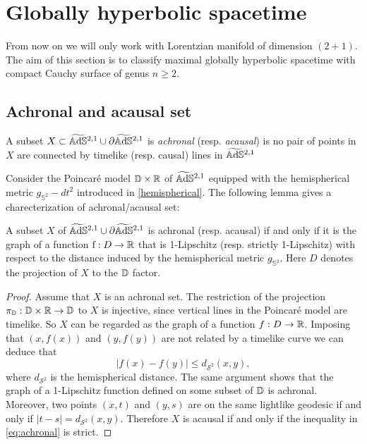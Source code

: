 \chapter{Globally hyperbolic spacetime}\label{chapter:4}

From now on we will only work with Lorentzian manifold of dimension $(2+1)$.\\
The aim of this section is to classify maximal globally hyperbolic spacetime with compact Cauchy surface of genus $n\geq 2$.

\section{Achronal and acausal set}

\begin{definition}
    A subset $X \subset \widetilde{\mathbb{A}\mathrm{d}\mathbb{S}}{}^{2,1} \cup \partial\widetilde{\mathbb{A}\mathrm{d}\mathbb{S}}{}^{2,1}$ is \textit{achronal} (resp. \textit{acausal}) is no pair of points in $X$ are connected by timelike (resp. causal) lines in $\widetilde{\mathbb{A}\mathrm{d}\mathbb{S}}{}^{2,1}$
\end{definition}
Consider the Poincaré model $\mathbb{D}\times\mathbb{R}$ of $\widetilde{\mathbb{A}\mathrm{d}\mathbb{S}}{}^{2,1}$ equipped with the hemispherical metric $g_{\mathbb{S}^2} - dt^2$ introduced in \ref{hemispherical}. The following lemma gives a charecterization of achronal/acausal set:
\begin{lemma}\label{lem:1-lip}
    A subset $X$ of $\widetilde{\mathbb{A}\mathrm{d}\mathbb{S}}{}^{2,1} \cup \partial\widetilde{\mathbb{A}\mathrm{d}\mathbb{S}}{}^{2,1}$ is achronal (resp. acausal) if and only if it is the graph of a function $\text{f} : D \to \mathbb{R}$ that is 1-Lipschitz (resp. strictly 1-Lipschitz) with respect to the distance induced by the hemispherical metric $g_{\mathbb{S}^2}$. Here $D$ denotes the projection of $X$ to the $\mathbb{D}$ factor.
\end{lemma} 
\begin{proof}
    Assume that $X$ is an achronal set. The restriction of the projection $\pi_{\mathbb{D}} : \mathbb{D} \times \mathbb{R} \to \mathbb{D}$ to $X$ is injective, since vertical lines in the Poincaré model are timelike. So $X$ can be regarded as the graph of a function $f : D \to\mathbb{R}$. Imposing that $(x,f(x))$ and $(y,f(y))$ are not related by a timelike curve we can deduce that
    \begin{equation} \label{eq:achronal}
        |f(x) - f(y)| \leq d_{\mathcal{S}^2}(x,y),
    \end{equation}
    where $d_{\mathcal{S}^2}$ is the hemispherical distance. The same argument shows that the graph of a 1-Lipschitz function defined on some subset of $\mathbb{D}$ is achronal.\\
    Moreover, two points $(x,t)$ and $(y,s)$ are on the same lightlike geodesic if and only if $|t-s| =  d_{\mathcal{S}^2}(x,y)$. Therefore $X$ is acausal if and only if the inequality in \ref{eq:achronal} is strict.
\end{proof}
